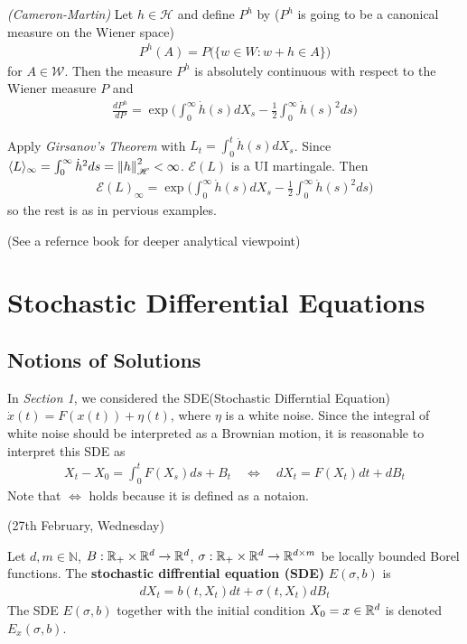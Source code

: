 \documentclass[12pt,a4paper]{article}
\newenvironment{proof}
{\begin{changemargin}{0.5cm}{0.5cm} 
	}%
	{\end{changemargin}
}
\newenvironment{p}
{\begin{proof} 
	}%
	{\end{proof}
}
\begin{document}
\thm \emph{(Cameron-Martin)} Let $h\in \mathscr{H}$ and define $P^h$ by ($P^h$ is going to be a canonical measure on the Wiener space)
\begin{align*}
P^h(A) = P \big( \{ w\in W : w+ h \in A \} \big)
\end{align*}
for $A\in \mathscr{W}$. Then the measure $P^h$ is absolutely continuous with respect to the Wiener measure $P$ and
\begin{align*}
\frac{dP^h}{dP} = \exp \Big( \int_0^{\infty} \dot{h}(s) dX_s - \frac{1}{2}\int_0^{\infty} \dot{h}(s)^2 ds \Big)
\end{align*}
\begin{p}
\pf Apply \emph{Girsanov's Theorem} with $L_t = \int_0^{t} \dot{h}(s) dX_s$. Since $\langle L \rangle_{\infty} = \int_0^{\infty} \dot{h}^2 ds = \snorms{h}{\mathscr{H}}^2 < \infty$. $\mathscr{E}(L)$ is a UI martingale. Then
\begin{align*}
\mathscr{E}(L)_{\infty} = \exp \Big( \int_0^{\infty} \dot{h}(s) dX_s - \frac{1}{2}\int_0^{\infty} \dot{h}(s)^2 ds \Big)
\end{align*}
so the rest is as in pervious examples.

\eop
\end{p}

(See a refernce book for deeper analytical viewpoint)


\section{Stochastic Differential Equations}

\subsection{Notions of Solutions}

In \emph{Section 1}, we considered the SDE(Stochastic Differntial Equation) $\dot{x}(t) =F(x(t)) + \eta(t)$, where $\eta$ is a white noise. Since the integral of white noise should be interpreted as a Brownian motion, it is reasonable to interpret this SDE as
\begin{align*}
X_t - X_0 = \int_0^t F(X_s) ds + B_t \quad \Leftrightarrow \quad dX_t = F(X_t) dt + dB_t 
\end{align*}
Note that $\Leftrightarrow$ holds because it is defined as a notaion.
\s

\newday

(27th February, Wednesday)
\s

 Let $d, m\in \mathbb{N}$, $B: \mathbb{R}_+ \times \mathbb{R}^d \rightarrow \mathbb{R}^d$, $\sigma : \mathbb{R}_+ \times \mathbb{R}^d \rightarrow \mathbb{R}^{d\times m}$ be locally bounded Borel functions. The \textbf{stochastic diffrential equation (SDE)} $E(\sigma, b)$ is
\begin{align*}
dX_t = b(t, X_t) dt + \sigma(t, X_t) dB_t
\end{align*}
The SDE $E(\sigma, b)$ together with the initial condition $X_0 = x\in \mathbb{R}^d$ is denoted $E_x(\sigma, b)$.
\s
\end{document}
